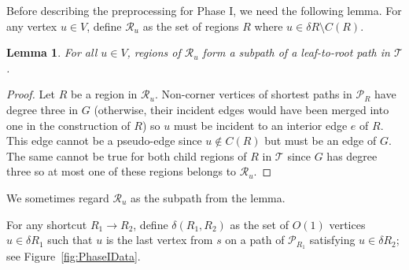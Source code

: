 \documentclass[11pt]{article}
\newtheorem{lemma}{Lemma}
\begin{document}
Before describing the preprocessing for Phase I, we need the following lemma. For any vertex $u\in V$, define $\mathcal R_u$ as the set of regions $R$ where $u\in\delta R\setminus C(R)$.
\begin{lemma}\label{Lem:RegionPath}
For all $u\in V$, regions of $\mathcal R_u$ form a subpath of a leaf-to-root path in $\mathcal T$.
\end{lemma}
\begin{proof}
Let $R$ be a region in $\mathcal R_u$. Non-corner vertices of shortest paths in $\mathcal P_R$ have degree three in $G$ (otherwise, their incident edges would have been merged into one in the construction of $R$) so $u$ must be incident to an interior edge $e$ of $R$. This edge cannot be a pseudo-edge since $u\notin C(R)$ but must be an edge of $G$. The same cannot be true for both child regions of $R$ in $\mathcal T$ since $G$ has degree three so at most one of these regions belongs to $\mathcal R_u$.
\end{proof}
We sometimes regard $\mathcal R_u$ as the subpath from the lemma.

For any shortcut $R_1\rightarrow R_2$, define $\delta(R_1,R_2)$ as the set of $O(1)$ vertices $u\in\delta R_1$ such that $u$ is the last vertex from $s$ on a path of $\mathcal P_{R_1}$ satisfying $u\in\delta R_2$; see Figure~\ref{fig:PhaseIData}.
\end{document}
